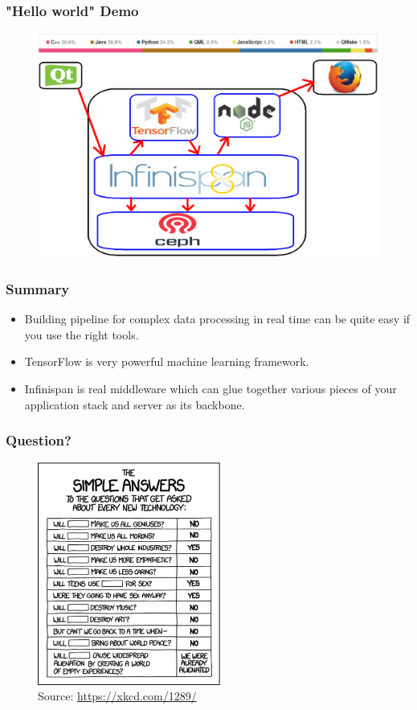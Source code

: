 \documentclass[10pt,utf8]{beamer}
\begin{document}
\begin{frame}
	\frametitle{"Hello world" Demo}
	\begin{figure}
		\centering
		\includegraphics[width=12cm]{./img/demo_github.eps} \\
		\vspace{0.4cm}
		\includegraphics[width=12cm]{./img/demo_arch.eps}
	\end{figure}
\end{frame}

\begin{frame}
	\frametitle{Summary}
	\begin{itemize}
		\item Building pipeline for complex data processing in real time can be quite easy if you use the right tools.
		\pause
		\item TensorFlow is very powerful machine learning framework.
		\pause
		\item Infinispan is real middleware which can glue together various pieces of your application stack and server as its backbone.
	\end{itemize}
\end{frame}

\begin{frame}
	\frametitle{Question?}
	\begin{figure}
		\centering
		\includegraphics[width=6cm]{./img/simple_answers.eps}
		\caption{\tiny{Source: \url{https://xkcd.com/1289/}}}
	\end{figure}
\end{frame}
\end{document}
